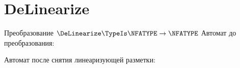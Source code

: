 \section{DeLinearize}
\begin{frame}{Преобразование $\DeLinearize\TypeIs\NFATYPE\to\NFATYPE$}
	Автомат до преобразования:


	Автомат после снятия линеаризующей разметки:


\end{frame}
